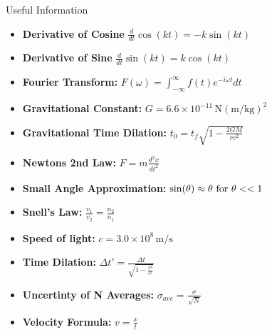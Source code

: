 \documentclass[11pt]{exam}
\newcommand{\unit}[1]{\ensuremath{\, \mathrm{#1}}}
\begin{document}
\Huge{Useful Information}
\normalsize
\begin{itemize}
\item\textbf{Derivative of Cosine} $\displaystyle\frac{d}{dt}\cos(kt) = -k\sin(kt)$\\
\item\textbf{Derivative of Sine} $\displaystyle\frac{d}{dt}\sin(kt) = k\cos(kt)$\\
\item\textbf{Fourier Transform:} $F(\omega) = \displaystyle\int_{-\infty}^{\infty}f(t)e^{-i\omega t}dt$\\
\item\textbf{Gravitational Constant:} $G=6.6\times10^{-11}\unit{N (m/kg)^2}$\\
\item\textbf{Gravitational Time Dilation:} $t_0 = \displaystyle t_f\sqrt{1-\frac{2GM}{rc^2}}$\\
\item\textbf{Newtons 2nd Law:} $F = \displaystyle m\frac{d^2x}{dt^2}$\\
\item\textbf{Small Angle Approximation:} $\displaystyle\sin(\theta) \approx \theta \ \textnormal{for} \ \theta<<1$\\
\item\textbf{Snell's Law:} $\displaystyle\frac{v_1}{v_2} = \frac{n_2}{n_1}$\\
\item\textbf{Speed of light:} $c=3.0\times10^{8}\unit{m/s}$\\
\item\textbf{Time Dilation:} $\displaystyle\Delta t' = \frac{\Delta t}{\sqrt{1-\frac{v^2}{c^2}}}$\\
\item\textbf{Uncertinty of N Averages:} $\displaystyle\sigma_{ave} = \frac{\sigma}{\sqrt{N}}$\\
\item\textbf{Velocity Formula:} $v = \displaystyle\frac{x}{t}$\\
\end{itemize}
\end{document}
